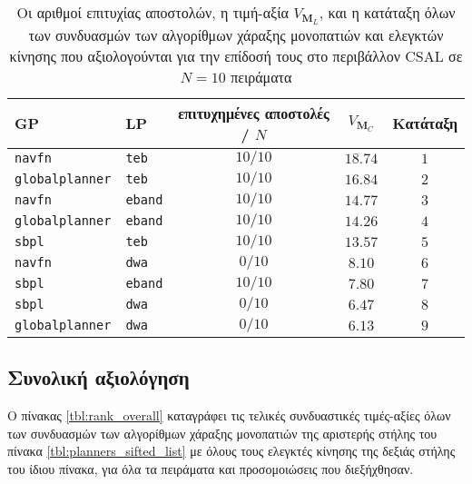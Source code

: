 \begin{table}[htb]\centering
\renewcommand{\arraystretch}{1.3}
\begin{tabular}{llccc}
  GP                     & LP             & επιτυχημένες αποστολές / $N$ & $V_{\bm{M}_C}$ & Κατάταξη \\ \toprule
  \texttt{navfn}         & \texttt{teb}   & $10/10$                      & $18.74$        & $1$      \\
  \texttt{globalplanner} & \texttt{teb}   & $10/10$                      & $16.84$        & $2$      \\
  \texttt{navfn}         & \texttt{eband} & $10/10$                      & $14.77$        & $3$      \\
  \texttt{globalplanner} & \texttt{eband} & $10/10$                      & $14.26$        & $4$      \\
  \texttt{sbpl}          & \texttt{teb}   & $10/10$                      & $13.57$        & $5$      \\
  \texttt{navfn}         & \texttt{dwa}   & $0/10$                       & $8.10$         & $6$      \\
  \texttt{sbpl}          & \texttt{eband} & $10/10$                      & $7.80$         & $7$      \\
  \texttt{sbpl}          & \texttt{dwa}   & $0/10$                       & $6.47$         & $8$      \\
  \texttt{globalplanner} & \texttt{dwa}   & $0/10$                       & $6.13$         & $9$      \\ \bottomrule
\end{tabular}
\caption{\small Οι αριθμοί επιτυχίας αποστολών, η τιμή-αξία $V_{\bm{M}_L}$, και
         η κατάταξη όλων των συνδυασμών των αλγορίθμων χάραξης μονοπατιών και
         ελεγκτών κίνησης που αξιολογούνται για την επίδοσή τους στο
         περιβάλλον CSAL σε $N=10$ πειράματα}
\label{tbl:rank_csal}
\end{table}


\subsection{Συνολική αξιολόγηση}
  \label{subsection:02_01_04:05}

Ο πίνακας \ref{tbl:rank_overall} καταγράφει τις τελικές συνδυαστικές τιμές-αξίες
όλων των συνδυασμών των αλγορίθμων χάραξης μονοπατιών της αριστερής στήλης
του πίνακα \ref{tbl:planners_sifted_list} με όλους τους ελεγκτές κίνησης της
δεξιάς στήλης του ίδιου πίνακα, για όλα τα πειράματα και προσομοιώσεις που
διεξήχθησαν.

